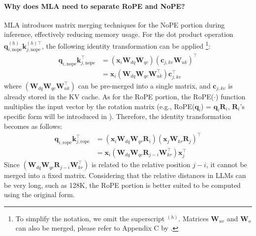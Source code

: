 \paragraph{Why does MLA need to separate RoPE and NoPE?}
MLA introduces matrix merging techniques for the NoPE portion during inference, 
effectively reducing memory usage. 
For the dot product operation \(\bm{q}_{i,\text{nope}}^{(h)} \bm{k}_{j,\text{nope}}^{(h)\top}\), the following identity transformation can be applied
\footnote{To simplify the notation, we omit the superscript $^{(h)}$. 
Matrices $\bm{W}_{uv}$ and $\bm{W}_{o}$ can also be merged, please refer to Appendix C by \citet{corr/abs-2405-04434}.}:
\begin{align}    
    \bm{q}_{i,\text{nope}} \bm{k}_{j,\text{nope}}^{\top} 
    &= \left(\bm{x}_i \bm{W}_{dq} \bm{W}_{qc}\right)\left(\bm{c}_{j,kv} \bm{W}_{uk}\right)^\top \nonumber\\
    &= \bm{x}_i \left(\bm{W}_{dq} \bm{W}_{qc}\bm{W}_{uk}^\top\right)\bm{c}_{j,kv}^\top \nonumber
\end{align}
where $\left(\bm{W}_{dq} \bm{W}_{qc}\bm{W}_{uk}^\top\right)$ can be pre-merged into a single matrix, and $\bm{c}_{j,kv}$ is already stored in the KV cache. 
As for the RoPE portion, the RoPE($\cdot$) function multiplies the input vector by the rotation matrix (e.g., RoPE($\bm{q}_i$) = $\bm{q}_i\bm{R}_i$, $\bm{R}_i$'s specific form will be introduced in ). 
Therefore, the identity transformation becomes as follows:
\begin{align}    
    \bm{q}_{i,\text{rope}} \bm{k}_{j,\text{rope}}^{\top} 
    &= \left(\bm{x}_i \bm{W}_{dq} \bm{W}_{qr} \bm{R}_i\right)\left(\bm{x}_j \bm{W}_{kr} \bm{R}_j\right)^\top \nonumber\\
    &= \bm{x}_i \left(\bm{W}_{dq} \bm{W}_{qc}\bm{R}_{j-i}\bm{W}_{kr}^\top\right)\bm{x}_{j}^\top \nonumber
\end{align}
Since \(\left(\bm{W}_{dq} \bm{W}_{qc} \bm{R}_{j-i} \bm{W}_{kr}^\top\right)\) is related to the relative position \(j-i\), it cannot be merged into a fixed matrix. 
Considering that the relative distances in LLMs can be very long, such as 128K, the RoPE portion is better suited to be computed using the original form.


